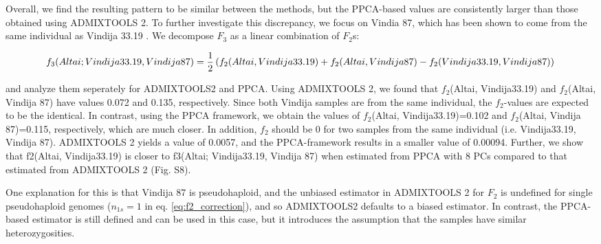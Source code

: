 \documentclass[12pt]{article}
\begin{document}
Overall, we find the resulting pattern to be similar between the methods, but the PPCA-based values are consistently larger than those obtained using ADMIXTOOLS 2. To further investigate this discrepancy, we focus on Vindia 87, which has been shown to come from the same individual as Vindija 33.19 \citep{hajdinjak_reconstructing_2018}. We decompose  $F_3$ as a linear combination of $F_2$s:

\begin{dmath}
    f_3(Altai; Vindija33.19, Vindija 87) = \frac{1}{2}\left( f_2(Altai, Vindija33.19) + f_2(Altai, Vindija 87) - f_2(Vindija33.19, Vindija 87) \right)\\
\end{dmath}

and analyze them seperately for ADMIXTOOLS2 and PPCA.
Using ADMIXTOOLS 2, we found that $f_2$(Altai, Vindija33.19) and $f_2$(Altai, Vindija 87) have values 0.072 and 0.135,  respectively. Since both Vindija samples are from the same individual, the $f_2$-values are expected to be the identical. In contrast, using the PPCA framework, we obtain the values of $f_2$(Altai, Vindija33.19)=0.102 and $f_2$(Altai, Vindija 87)=0.115, respectively, which are much closer. In addition, $f_2$ should be 0 for two samples from the same individual (i.e. Vindija33.19, Vindija 87). ADMIXTOOLS 2 yields a value of 0.0057, and the PPCA-framework results in a smaller value of 0.00094. Further, we show that f2(Altai, Vindija33.19) is closer to f3(Altai; Vindija33.19, Vindija 87) when estimated from PPCA with 8 PCs compared to that estimated from ADMIXTOOLS 2 (Fig. S8).

One explanation for this is that Vindija 87 is pseudohaploid, and the unbiased estimator in ADMIXTOOLS 2 for $F_2$ is undefined for single pseudohaploid genomes ($n_{1s}=1$ in eq. \ref{eq:f2_correction}), and so ADMIXTOOLS2 defaults to a biased estimator. In contrast, the PPCA-based estimator is still defined and can be used in this case, but it introduces the assumption that the samples have similar heterozygosities. 
\end{document}
